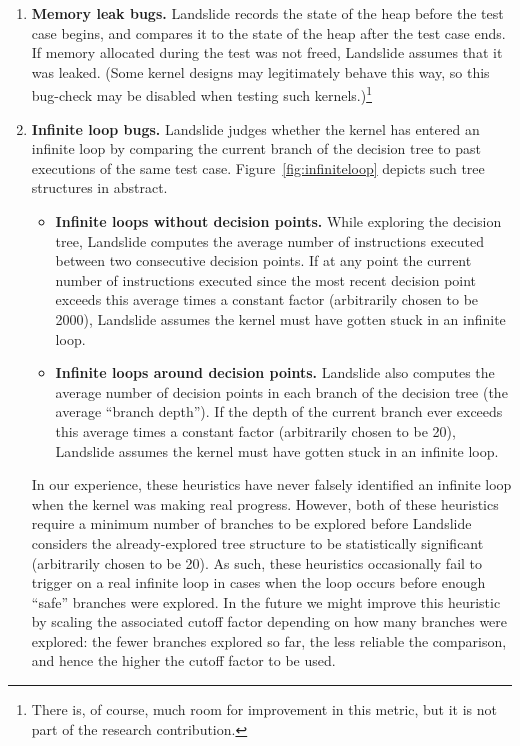 \begin{enumerate}
	\item {\bf Memory leak bugs.} Landslide records the state of the heap before the test case begins, and compares it to the state of the heap after the test case ends. If memory allocated during the test was not freed, Landslide assumes that it was leaked.
		(Some kernel designs may legitimately behave this way, so this bug-check may be disabled when testing such kernels.)\footnote{There is, of course, much room for improvement in this metric, but it is not part of the research contribution.}
	\item {\bf Infinite loop bugs.} Landslide judges whether the kernel has entered an infinite loop by comparing the current branch of the decision tree to past executions of the same test case.
	Figure~\ref{fig:infiniteloop} depicts such tree structures in abstract.
	\begin{itemize}
		\item {\bf Infinite loops without decision points.} While exploring the decision tree, Landslide computes the average number of instructions executed between two consecutive decision points. If at any point the current number of instructions executed since the most recent decision point exceeds this average times a constant factor (arbitrarily chosen to be 2000), Landslide assumes the kernel must have gotten stuck in an infinite loop.
		\item {\bf Infinite loops around decision points.} Landslide also computes the average number of decision points in each branch of the decision tree (the average ``branch depth''). If the depth of the current branch ever exceeds this average times a constant factor (arbitrarily chosen to be 20), Landslide assumes the kernel must have gotten stuck in an infinite loop.
	\end{itemize}
	In our experience, these heuristics have never falsely identified an infinite loop when the kernel was making real progress.
	However, both of these heuristics require a minimum number of branches to be explored before Landslide considers the already-explored tree structure to be statistically significant (arbitrarily chosen to be 20).
	As such, these heuristics occasionally fail to trigger on a real infinite loop in cases when the loop occurs before enough ``safe'' branches were explored. In the future we might improve this heuristic by scaling the associated cutoff factor depending on how many branches were explored: the fewer branches explored so far, the less reliable the comparison, and hence the higher the cutoff factor to be used.
\end{enumerate}

